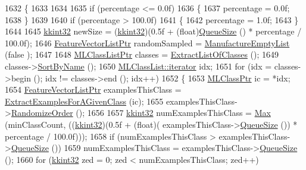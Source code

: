 \begin{DoxyCode}
1632 \{
1633 
1634 
1635   \textcolor{keywordflow}{if}  (percentage <= 0.0f)
1636   \{
1637     percentage = 0.0f;
1638   \}
1639 
1640   \textcolor{keywordflow}{if}  (percentage > 100.0f)
1641   \{
1642     percentage = 1.0f;
1643   \}
1644 
1645   \hyperlink{namespace_k_k_b_a8fa4952cc84fda1de4bec1fbdd8d5b1b}{kkint32}  newSize = (\hyperlink{namespace_k_k_b_a8fa4952cc84fda1de4bec1fbdd8d5b1b}{kkint32})(0.5f + (\textcolor{keywordtype}{float})\hyperlink{class_k_k_b_1_1_k_k_queue_a1dab601f75ee6a65d97f02bddf71c40d}{QueueSize} () * percentage / 100.0f);
1646   \hyperlink{class_k_k_m_l_l_1_1_feature_vector_list}{FeatureVectorListPtr}  randomSampled = \hyperlink{class_k_k_m_l_l_1_1_feature_vector_list_af533da1b34e4123f4fcb1343d5f48e37}{ManufactureEmptyList} (\textcolor{keyword}{false}
      );
1647 
1648   \hyperlink{class_k_k_m_l_l_1_1_m_l_class_list}{MLClassListPtr}  classes = \hyperlink{class_k_k_m_l_l_1_1_feature_vector_list_af4bffa9713e7632b9e0e33f931528164}{ExtractListOfClasses} ();
1649   classes->\hyperlink{class_k_k_m_l_l_1_1_m_l_class_list_a00b4e0ed01e65ca7e6c21c285ea45c02}{SortByName} ();
1650   \hyperlink{class_k_k_b_1_1_k_k_queue_aa3c2796a726eea468b94132a9fbf2cfe}{MLClassList::iterator}  idx;
1651   \textcolor{keywordflow}{for}  (idx = classes->begin ();  idx != classes->end ();  idx++)
1652   \{
1653     \hyperlink{class_k_k_m_l_l_1_1_m_l_class}{MLClassPtr} ic = *idx;
1654     \hyperlink{class_k_k_m_l_l_1_1_feature_vector_list}{FeatureVectorListPtr}  examplesThisClass = 
      \hyperlink{class_k_k_m_l_l_1_1_feature_vector_list_ab9c72c62046bf92e24e7e635d425792b}{ExtractExamplesForAGivenClass} (ic);
1655     examplesThisClass->\hyperlink{class_k_k_b_1_1_k_k_queue_ab43920c3ec182b87d3affa1e1611e1b0}{RandomizeOrder} ();
1656 
1657     \hyperlink{namespace_k_k_b_a8fa4952cc84fda1de4bec1fbdd8d5b1b}{kkint32}  numExamplesThisClass = \hyperlink{namespace_k_k_b_a25e187e24c091586293725f27f007ad7}{Max} (minClassCount, ((\hyperlink{namespace_k_k_b_a8fa4952cc84fda1de4bec1fbdd8d5b1b}{kkint32})(0.5f + (\textcolor{keywordtype}{float})(
      examplesThisClass->\hyperlink{class_k_k_b_1_1_k_k_queue_a1dab601f75ee6a65d97f02bddf71c40d}{QueueSize} ()) * percentage / 100.0f)));
1658     \textcolor{keywordflow}{if}  (numExamplesThisClass > examplesThisClass->\hyperlink{class_k_k_b_1_1_k_k_queue_a1dab601f75ee6a65d97f02bddf71c40d}{QueueSize} ())
1659       numExamplesThisClass = examplesThisClass->\hyperlink{class_k_k_b_1_1_k_k_queue_a1dab601f75ee6a65d97f02bddf71c40d}{QueueSize} ();
1660     \textcolor{keywordflow}{for}  (\hyperlink{namespace_k_k_b_a8fa4952cc84fda1de4bec1fbdd8d5b1b}{kkint32} zed = 0;  zed < numExamplesThisClass;  zed++)

\end{DoxyCode}
